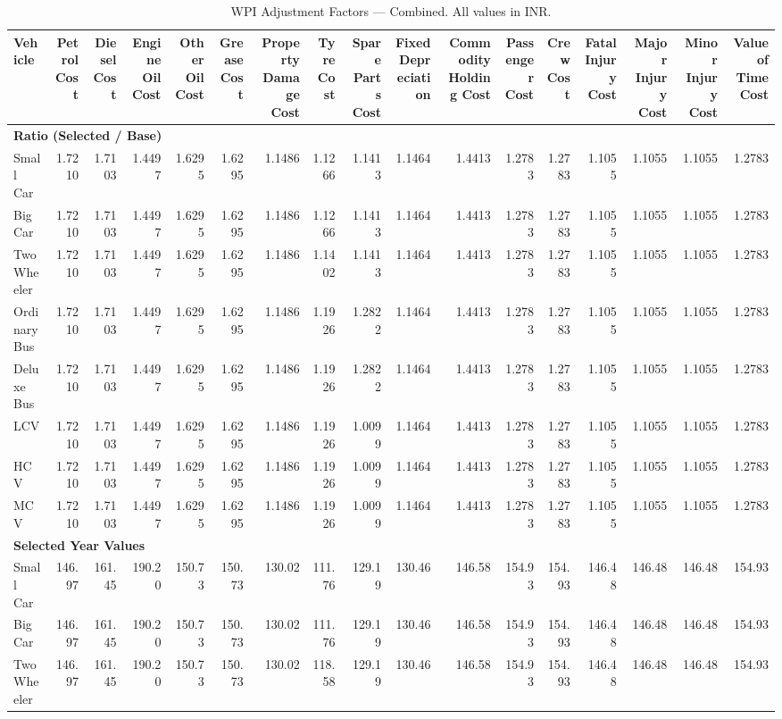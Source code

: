 \documentclass[12pt,a4paper]{article}
\begin{document}
\begin{landscape}
\begin{table}[H]%
\centering%
\caption{WPI Adjustment Factors — Combined. All values in INR.}%
\label{tab:wpi_combined}%
\begin{adjustbox}{width=\linewidth}\begin{tabular}{lrrrrrrrrrrrrrrrr}%
\toprule%
Vehicle&Petrol Cost&Diesel Cost&Engine Oil Cost&Other Oil Cost&Grease Cost&Property Damage Cost&Tyre Cost&Spare Parts Cost&Fixed Depreciation&Commodity Holding Cost&Passenger Cost&Crew Cost&Fatal Injury Cost&Major Injury Cost&Minor Injury Cost&Value of Time Cost\\%
\midrule%
\multicolumn{17}{l}{\textbf{Ratio (Selected / Base)}} \\%
\midrule%
Small Car&1.7210&1.7103&1.4497&1.6295&1.6295&1.1486&1.1266&1.1413&1.1464&1.4413&1.2783&1.2783&1.1055&1.1055&1.1055&1.2783\\%
Big Car&1.7210&1.7103&1.4497&1.6295&1.6295&1.1486&1.1266&1.1413&1.1464&1.4413&1.2783&1.2783&1.1055&1.1055&1.1055&1.2783\\%
Two Wheeler&1.7210&1.7103&1.4497&1.6295&1.6295&1.1486&1.1402&1.1413&1.1464&1.4413&1.2783&1.2783&1.1055&1.1055&1.1055&1.2783\\%
Ordinary Bus&1.7210&1.7103&1.4497&1.6295&1.6295&1.1486&1.1926&1.2822&1.1464&1.4413&1.2783&1.2783&1.1055&1.1055&1.1055&1.2783\\%
Deluxe Bus&1.7210&1.7103&1.4497&1.6295&1.6295&1.1486&1.1926&1.2822&1.1464&1.4413&1.2783&1.2783&1.1055&1.1055&1.1055&1.2783\\%
LCV&1.7210&1.7103&1.4497&1.6295&1.6295&1.1486&1.1926&1.0099&1.1464&1.4413&1.2783&1.2783&1.1055&1.1055&1.1055&1.2783\\%
HCV&1.7210&1.7103&1.4497&1.6295&1.6295&1.1486&1.1926&1.0099&1.1464&1.4413&1.2783&1.2783&1.1055&1.1055&1.1055&1.2783\\%
MCV&1.7210&1.7103&1.4497&1.6295&1.6295&1.1486&1.1926&1.0099&1.1464&1.4413&1.2783&1.2783&1.1055&1.1055&1.1055&1.2783\\%
\midrule%
\multicolumn{17}{l}{\textbf{Selected Year Values}} \\%
\midrule%
Small Car&146.97&161.45&190.20&150.73&150.73&130.02&111.76&129.19&130.46&146.58&154.93&154.93&146.48&146.48&146.48&154.93\\%
Big Car&146.97&161.45&190.20&150.73&150.73&130.02&111.76&129.19&130.46&146.58&154.93&154.93&146.48&146.48&146.48&154.93\\%
Two Wheeler&146.97&161.45&190.20&150.73&150.73&130.02&118.58&129.19&130.46&146.58&154.93&154.93&146.48&146.48&146.48&154.93\\%

\end{tabular}
\end{adjustbox}
\end{table}
\end{landscape}
\end{document}
